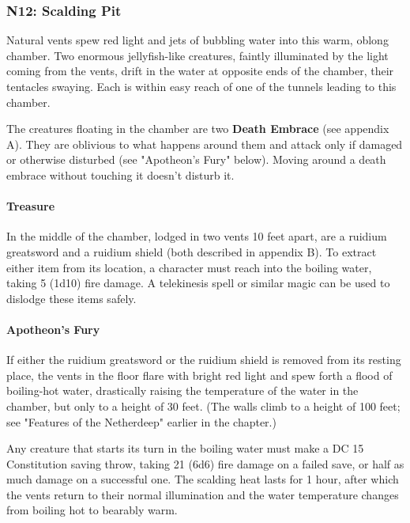 \documentclass[10pt,a4paper,twoside,twocolumn,openany,nodeprecatedcode]{dndbook}
\begin{document}
\subsubsection{N12: Scalding Pit}
\begin{DndReadAloud}{}
Natural vents spew red light and jets of bubbling water into this warm, oblong chamber. Two enormous jellyfish-like creatures, faintly illuminated by the light coming from the vents, drift in the water at opposite ends of the chamber, their tentacles swaying. Each is within easy reach of one of the tunnels leading to this chamber.

\end{DndReadAloud}


The creatures floating in the chamber are two \textbf{Death Embrace} (see appendix A). They are oblivious to what happens around them and attack only if damaged or otherwise disturbed (see "Apotheon's Fury" below). Moving around a death embrace without touching it doesn't disturb it.

\paragraph{Treasure}
In the middle of the chamber, lodged in two vents 10 feet apart, are a ruidium greatsword and a ruidium shield (both described in appendix B). To extract either item from its location, a character must reach into the boiling water, taking 5 (1d10) fire damage. A telekinesis spell or similar magic can be used to dislodge these items safely.

\paragraph{Apotheon's Fury}
If either the ruidium greatsword or the ruidium shield is removed from its resting place, the vents in the floor flare with bright red light and spew forth a flood of boiling-hot water, drastically raising the temperature of the water in the chamber, but only to a height of 30 feet. (The walls climb to a height of 100 feet; see "Features of the Netherdeep" earlier in the chapter.)

Any creature that starts its turn in the boiling water must make a DC 15 Constitution saving throw, taking 21 (6d6) fire damage on a failed save, or half as much damage on a successful one. The scalding heat lasts for 1 hour, after which the vents return to their normal illumination and the water temperature changes from boiling hot to bearably warm.
\end{document}
